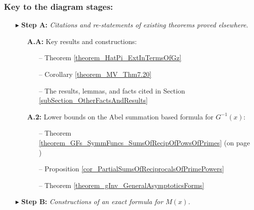 \documentclass[11pt,reqno,a4letter]{article}
\numberwithin{figure}{section}
\numberwithin{table}{section}
\theoremstyle{plain}
\numberwithin{theorem}{section}
\theoremstyle{definition}
\begin{document}
\subsubsection*{Key to the diagram stages: } 
\begin{itemize}[noitemsep,topsep=0pt,leftmargin=0.95in]

\item[$\blacktriangleright$ \textbf{Step A:}] \textit{Citations and re-statements of existing theorems proved elsewhere. }
     \begin{itemize}[noitemsep,topsep=0pt,leftmargin=0.35in] 
     \item[\textbf{A.A:}] Key results and constructions: 
          \begin{itemize}[noitemsep,topsep=0pt,leftmargin=0.25in]
          \item[--] \small{Theorem \ref{theorem_HatPi_ExtInTermsOfGz}} 
          \item[--] \small{Corollary \ref{theorem_MV_Thm7.20}} 
          \item[--] \small{The results, lemmas, and facts cited in Section \ref{subSection_OtherFactsAndResults}}
          \end{itemize} 
     \item[\textbf{A.2:}] Lower bounds on the Abel summation based formula for $G^{-1}(x)$: 
          \begin{itemize}[noitemsep,topsep=0pt,leftmargin=0.25in]
          \item[--] \small{Theorem \ref{theorem_GFs_SymmFuncs_SumsOfRecipOfPowsOfPrimes} 
                    (on page \pageref{proofOf_theorem_GFs_SymmFuncs_SumsOfRecipOfPowsOfPrimes})} 
          \item[--] \small{Proposition \ref{cor_PartialSumsOfReciprocalsOfPrimePowers}} 
          \item[--] \small{Theorem \ref{theorem_gInv_GeneralAsymptoticsForms}} 
          \end{itemize} 
     \end{itemize} 
\item[$\blacktriangleright$ \textbf{Step B:}] \textit{Constructions of an exact formula for $M(x)$. } 

\end{itemize}
\end{document}
